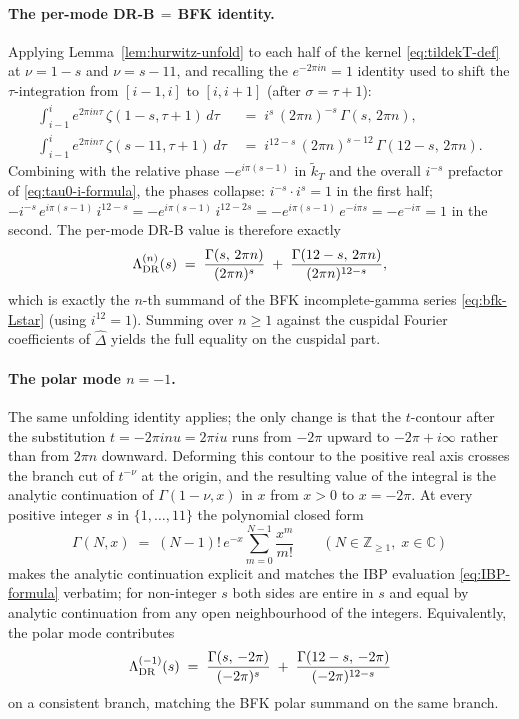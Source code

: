 \documentclass[11pt,letterpaper]{article}
\newcommand{\ZZ}{\mathbb{Z}}
\newcommand{\CC}{\mathbb{C}}
\newcommand{\Dhat}{\widehat{\Delta}}
\begin{document}
\paragraph{The per-mode DR-B$\,=\,$BFK identity.}
Applying Lemma~\ref{lem:hurwitz-unfold} to each half of the kernel \eqref{eq:tildekT-def} at $\nu = 1 - s$ and $\nu = s - 11$, and recalling the $e^{-2\pi i n} = 1$ identity used to shift the $\tau$-integration from $[i-1, i]$ to $[i, i+1]$ (after $\sigma = \tau + 1$):
\begin{align*}
\int_{i-1}^{i} e^{2\pi i n \tau}\,\zeta(1 - s, \tau + 1)\,d\tau
\;&=\; i^{s}\,(2\pi n)^{-s}\,\Gamma(s,\, 2\pi n), \\
\int_{i-1}^{i} e^{2\pi i n \tau}\,\zeta(s - 11, \tau + 1)\,d\tau
\;&=\; i^{12 - s}\,(2\pi n)^{s - 12}\,\Gamma(12 - s,\, 2\pi n).
\end{align*}
Combining with the relative phase $-e^{i\pi(s-1)}$ in $\widetilde{k}_T$ and the overall $i^{-s}$ prefactor of \eqref{eq:tau0-i-formula}, the phases collapse:
$i^{-s}\cdot i^{s} = 1$ in the first half; $-i^{-s}\,e^{i\pi(s-1)}\,i^{12-s} = -e^{i\pi(s-1)}\,i^{12 - 2s} = -e^{i\pi(s-1)}\,e^{-i\pi s} = -e^{-i\pi} = 1$ in the second.  The per-mode DR-B value is therefore exactly
\begin{equation}\label{eq:per-mode-equality}
\Lambda^{(n)}_{\rm DR}(s)
\;=\; \frac{\Gamma(s,\,2\pi n)}{(2\pi n)^{s}} \;+\; \frac{\Gamma(12-s,\,2\pi n)}{(2\pi n)^{12-s}},
\end{equation}
which is exactly the $n$-th summand of the BFK incomplete-gamma series \eqref{eq:bfk-Lstar} (using $i^{12} = 1$).  Summing over $n \ge 1$ against the cuspidal Fourier coefficients of $\Dhat$ yields the full equality on the cuspidal part.

\paragraph{The polar mode $n = -1$.}
The same unfolding identity applies; the only change is that the $t$-contour after the substitution $t = -2\pi i n u = 2\pi i u$ runs from $-2\pi$ upward to $-2\pi + i\infty$ rather than from $2\pi n$ downward.  Deforming this contour to the positive real axis crosses the branch cut of $t^{-\nu}$ at the origin, and the resulting value of the integral is the analytic continuation of $\Gamma(1 - \nu, x)$ in $x$ from $x > 0$ to $x = -2\pi$.  At every positive integer $s$ in $\{1, \ldots, 11\}$ the polynomial closed form
\[
\Gamma(N, x) \;=\; (N - 1)!\,e^{-x}\sum_{m=0}^{N-1}\frac{x^m}{m!}
\qquad (N \in \ZZ_{\ge 1}, \; x \in \CC)
\]
makes the analytic continuation explicit and matches the IBP evaluation \eqref{eq:IBP-formula} verbatim; for non-integer $s$ both sides are entire in $s$ and equal by analytic continuation from any open neighbourhood of the integers.  Equivalently, the polar mode contributes
\[
\Lambda^{(-1)}_{\rm DR}(s)
\;=\; \frac{\Gamma(s,\,-2\pi)}{(-2\pi)^{s}} \;+\; \frac{\Gamma(12-s,\,-2\pi)}{(-2\pi)^{12-s}}
\]
on a consistent branch, matching the BFK polar summand on the same branch.
\end{document}
